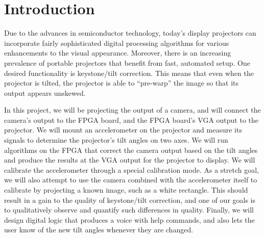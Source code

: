 \documentclass{article}
\begin{document}
\maketitle


\section{Introduction}
Due to the advances in semiconductor technology, today's display projectors can incorporate fairly sophisticated digital processing algorithms for various enhancements to the visual appearance.
Moreover, there is an increasing prevalence of portable projectors that benefit from fast, automated setup.
One desired functionality is keystone/tilt correction.
This means that even when the projector is tilted, the projector is able to ``pre-warp'' the image so that its output appears unskewed.

In this project, we will be projecting the output of a camera, and will connect the camera's output to the FPGA board, and the FPGA board's VGA output to the projector.
We will mount an accelerometer on the projector and measure its signals to determine the projector's tilt angles on two axes.
We will run algorithms on the FPGA that correct the camera output based on the tilt angles and produce the results at the VGA output for the projector to display.
We will calibrate the accelerometer through a special calibration mode.
As a stretch goal, we will also attempt to use the camera combined with the accelerometer itself to calibrate by projecting a known image, such as a white rectangle.
This should result in a gain to the quality of keystone/tilt correction, and one of our goals is to qualitatively observe and quantify such differences in quality.
Finally, we will design digital logic that produces a voice with help commands, and also lets the user know of the new tilt angles whenever they are changed.
\end{document}
